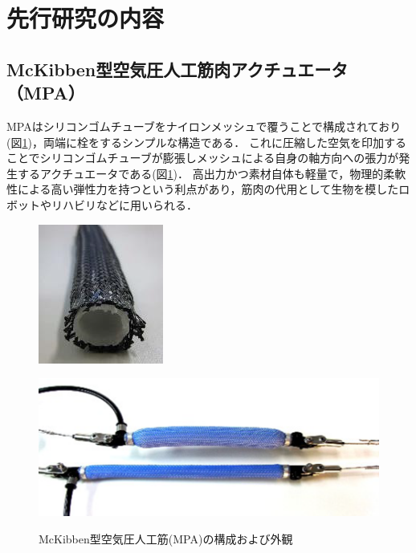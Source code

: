 \newpage
\section{先行研究の内容}
\subsection{McKibben型空気圧人工筋肉アクチュエータ（MPA）}
MPAはシリコンゴムチューブをナイロンメッシュで覆うことで構成されており(図\ref{fig:MPA})，両端に栓をするシンプルな構造である．
これに圧縮した空気を印加することでシリコンゴムチューブが膨張しメッシュによる自身の軸方向への張力が発生するアクチュエータである(図\ref{fig:MPA})．
高出力かつ素材自体も軽量で，物理的柔軟性による高い弾性力を持つという利点があり，筋肉の代用として生物を模したロボットやリハビリなどに用いられる．
\begin{figure}[b]
  \begin{minipage}{0.49\columnwidth}
    \vspace{4mm}
    \centering
    \includegraphics[scale=1]{image/MPA_kousei.png}
    \vspace{3mm}
    \label{fig:Structure}
  \end{minipage}
  \begin{minipage}{0.49\columnwidth}
    \vspace{10mm}
    \centering
    \includegraphics[scale=.8]{image/MPA_dousa.png}
    \vspace{10mm}
    \label{fig:move}
  \end{minipage}
  \caption{McKibben型空気圧人工筋(MPA)の構成および外観\cite{中西大輔2020}}
  \label{fig:MPA}
\end{figure}
